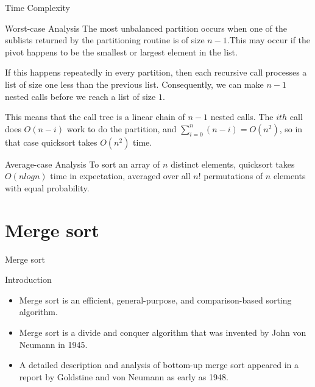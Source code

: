 \documentclass{beamer}
\begin{document}
\begin{frame}{Time Complexity}
    
    \begin{alertblock}{Worst-case Analysis}
    	The most unbalanced partition occurs when one of the sublists returned by the partitioning routine is of size $n - 1$.This may occur if the pivot happens to be the smallest or largest element in the list.\pause
    	
    	If this happens repeatedly in every partition, then each recursive call processes a list of size one less than the previous list. Consequently, we can make $n - 1$ nested calls before we reach a list of size $1$.\pause 
    	
    	This means that the call tree is a linear chain of $n - 1$ nested calls. The $ith$ call does $O(n - i)$ work to do the partition, and $\sum_{i=0}^{n} (n-i) = O(n^2)$, so in that case quicksort takes \alert{$O(n^2)$} time.
    \end{alertblock}\pause
   
    \begin{block}{Average-case Analysis}
    To sort an array of $n$ distinct elements, quicksort takes \alert{$O(n log n)$} time in expectation, averaged over all $n!$ permutations of $n$ elements with equal probability. 	
    \end{block}

\end{frame}

 \section{Merge sort}
\begin{frame}{Merge sort}
		\begin{block}{Introduction}
			\begin{itemize}
			\item<2->  Merge sort is an efficient, general-purpose, and comparison-based sorting algorithm. 
			\item<3-> Merge sort is a divide and conquer algorithm that was invented by John von Neumann in 1945. 
			\item<4->A detailed description and analysis of bottom-up merge sort appeared in a report by Goldstine and von Neumann as early as 1948.
			\end{itemize}
		\end{block}
\end{frame}	  
\end{document}
